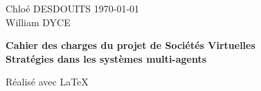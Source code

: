 \documentclass[a4paper]{article}
\begin{document}
\large
\setlength{\parskip}{5mm plus2mm minus2mm}

\begin{titlepage} 
{\setlength{\parindent}{0cm}
Chloé DESDOUITS \hfill \today\\
William DYCE
}
\vfill
{\centering \Large \bfseries Cahier des charges du projet de Sociétés Virtuelles\\Stratégies dans les systèmes multi-agents\par}
\vfill
\end{titlepage} 



\vfill
{\raggedleft Réalisé avec \LaTeX{} \par}
\end{document}
